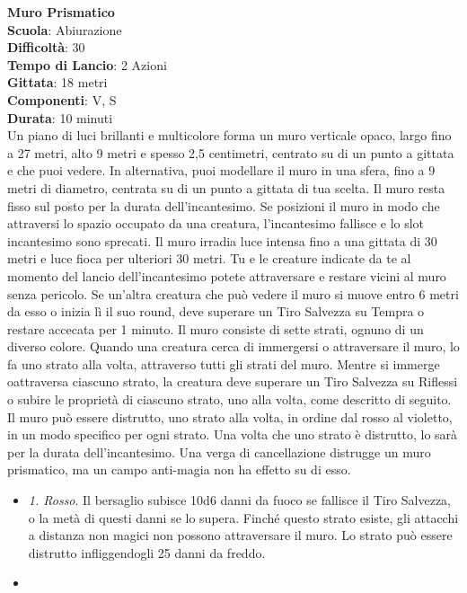 \begin{multicols}{2}
\medskip\textbf{Muro Prismatico}\\
\textbf{Scuola}: Abiurazione\\
\textbf{Difficoltà}: 30\\
\textbf{Tempo di Lancio}: 2 Azioni\\
\textbf{Gittata}: 18 metri\\
\textbf{Componenti}: V, S\\
\textbf{Durata}: 10 minuti\\
Un piano di luci brillanti e multicolore forma un muro verticale opaco, largo fino a 27 metri, alto 9 metri e spesso 2,5 centimetri, centrato su di un punto a gittata e che puoi vedere. In alternativa, puoi modellare il muro in una sfera, fino a 9 metri di diametro, centrata su di un punto a gittata di tua scelta. Il muro resta fisso sul posto per la durata dell'incantesimo. Se posizioni il muro in modo che attraversi lo spazio occupato da una creatura, l'incantesimo fallisce e lo slot incantesimo sono sprecati. Il muro irradia luce intensa fino a una gittata di 30 metri e luce fioca per ulteriori 30 metri. Tu e le creature indicate da te al momento del lancio dell'incantesimo potete attraversare e restare vicini al muro senza pericolo. Se un'altra creatura che può vedere il muro si muove entro 6 metri da esso o inizia lì il suo round, deve superare un Tiro Salvezza su Tempra o restare accecata per 1 minuto. Il muro consiste di sette strati, ognuno di un diverso colore. Quando una creatura cerca di immergersi o attraversare il muro, lo fa uno strato alla volta, attraverso tutti gli strati del muro. Mentre si immerge oattraversa ciascuno strato, la creatura deve superare un Tiro Salvezza su Riflessi o subire le proprietà di ciascuno strato, uno alla volta, come descritto di seguito.\\
Il muro può essere distrutto, uno strato alla volta, in ordine dal rosso al violetto, in un modo specifico per ogni strato. Una volta che uno strato è distrutto, lo sarà per la durata dell'incantesimo. Una verga di cancellazione distrugge un muro prismatico, ma un campo anti-magia non ha effetto su di esso.
\medskip
\begin{itemize}
\item
\textit{1. Rosso}. Il bersaglio subisce 10d6 danni da fuoco se fallisce il Tiro Salvezza, o la metà di questi danni se lo supera. Finché questo strato esiste, gli attacchi a distanza non magici non possono attraversare il muro. Lo strato può essere distrutto infliggendogli 25 danni da freddo.
\item

\end{itemize}
\end{multicols}
